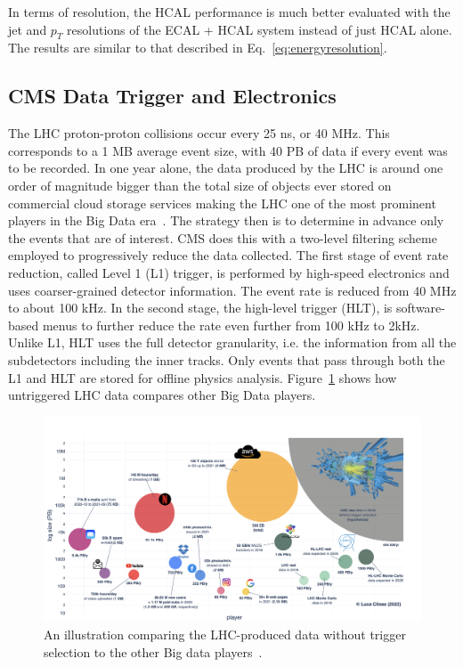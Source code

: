 In terms of resolution, the HCAL performance is much better evaluated with the jet and $p_T$ resolutions of the ECAL + HCAL system instead of just HCAL alone. The results are similar to that described in Eq.~\ref{eq:energyresolution}.

\subsection{CMS Data Trigger and Electronics }

The LHC proton-proton collisions occur every 25 ns, or 40 MHz. This corresponds to a 1 MB average event size, with 40 PB of data if every event was to be recorded. In one year alone, the data produced by the LHC is around one order of magnitude bigger than the total size of objects ever stored on commercial cloud storage services making the LHC one of the most prominent players in the Big Data era~\cite{Clissa:2021}. The strategy then is to determine in advance only the events that are of interest. CMS does this with a two-level filtering scheme employed to progressively reduce the data collected. The first stage of event rate reduction, called Level 1 (L1) trigger, is performed by high-speed electronics and uses coarser-grained detector information. The event rate is reduced from 40 MHz to about 100 kHz. In the second stage, the high-level trigger (HLT), is software-based menus to further reduce the rate even further from 100 kHz to 2kHz. Unlike L1, HLT uses the full detector granularity, i.e. the information from all the subdetectors including the inner tracks. Only events that pass through both the L1 and HLT are stored for offline physics analysis. Figure~\ref{fig:LHC_BigData} shows how untriggered LHC data compares other Big Data players. 


\begin{figure}[tbp!]
\begin{center}
\includegraphics[scale=0.4]{fig/BigData.png}
\end{center}
\caption{An illustration comparing the LHC-produced data without trigger selection to the other Big data players~\cite{Clissa:2021}.
}
\label{fig:LHC_BigData}
\end{figure}


